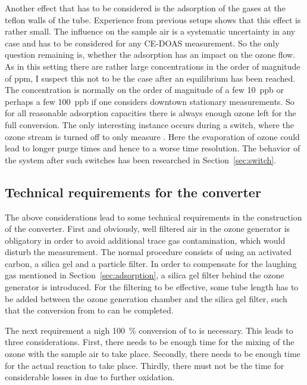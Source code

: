 Another effect that has to be considered is the adsorption of the
gases at the teflon walls of the tube. Experience from previous setups
shows that this effect is rather small. The influence on the sample
air is a systematic uncertainty in any case and has to be considered
for any CE-DOAS measurement. So the only question remaining is,
whether the adsorption has an impact on the ozone flow. As in this
setting there are rather large concentrations in the order of
magnitude of \si{ppm}, I suspect this not to be the case after an
equilibrium has been reached. The  concentration is normally on
the order of magnitude of a few \SI{10}{ppb} or perhaps a few
\SI{100}{ppb} if one considers downtown stationary measurements. So
for all reasonable adsorption capacities there is always enough ozone
left for the full conversion. The only interesting instance occurs
during a switch, where the ozone stream is turned off to only measure
. Here the evaporation of ozone could lead to longer purge
times and hence to a worse time resolution. The behavior of the
system after such switches has been researched in
Section~\ref{sec:switch}.

\subsection{Technical requirements for the converter}
\label{sec:requirements}

The above considerations lead to some technical requirements in the
construction of the converter. First and obviously, well filtered air
in the ozone generator is obligatory in order to avoid additional
trace gas contamination, which would disturb the measurement. The
normal procedure consists of using an activated carbon, a silica gel
and a particle filter. In order to compensate for the laughing gas mentioned in
Section~\ref{sec:adsorption}, a silica gel filter behind the ozone
generator is introduced. For the filtering to be effective, some tube
length has to be added between the ozone generation chamber and the
silica gel filter, such that the conversion from  to 
can be completed.

The next requirement a nigh \SI{100}{\%} conversion of 
to  is necessary. This leads to three considerations. First,
there needs to be enough time for the mixing of the ozone with the
sample air to take place. Secondly, there needs to be enough time for
the actual reaction to take place. Thirdly, there must not be the time 
for considerable losses in  due to further oxidation.

